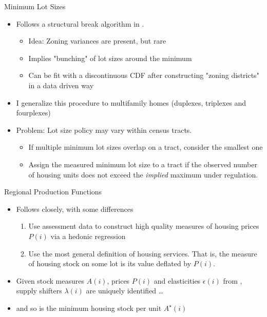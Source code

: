 \documentclass{beamer}
\theoremstyle{plain}
\begin{document}
\begin{frame}{Minimum Lot Sizes}
	\begin{itemize}
		\color{black}
		\itemsep1em
		\item Follows a structural break algorithm in \cite{Song}.
			\begin{itemize}
				\item Idea: Zoning variances are present, but rare
				\item Implies "bunching" of lot sizes around the minimum 
				\item Can be fit with a discontinuous CDF after constructing "zoning districts" in a data driven way
			\end{itemize} \pause
		
		\item I generalize this procedure to multifamily homes (duplexes, triplexes and fourplexes)
		
		\item Problem: Lot size policy may vary within census tracts. 
		\begin{itemize}
			\item If multiple minimum lot sizes overlap on a tract, consider the smallest one
			\item Assign the measured minimum lot size to a tract if the observed number of housing units does not exceed the \textit{implied} maximum under regulation. 
		\end{itemize}
	\end{itemize}
\end{frame}

\begin{frame}{Regional Production Functions}
	\begin{itemize}
		\itemsep1em
		\color{black}
		\item Follows \cite{BSH} closely, with some differences
		\begin{enumerate}
			\item Use assessment data to construct high quality measures of housing prices $P(i)$ via a hedonic regression
			\item Use the most general definition of housing services. That is, the measure of housing stock on some lot is its value deflated by $P(i)$.  \pause
		\end{enumerate}
		\item Given stock measures $A(i)$, prices $P(i)$ and elasticities $\epsilon(i)$ from \cite{BSH}, supply shifters $\lambda(i)$ are uniquely identified \dots
		\item and so is the minimum housing stock per unit $A^{\star}(i)$
	\end{itemize}
\end{frame}
\end{document}
